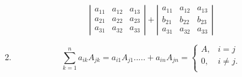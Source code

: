 \documentclass[11pt, a4paper, UTF8]{ctexart}
\begin{document}
\begin{solution}
\begin{enumerate}
\begin{enumerate}
$${        \left|\begin{array}{cccc} 
            a_{11} &    a_{12}    & a_{13} \\ 
            a_{21} &    a_{22}  & a_{23}\\ 
            a_{31} &    a_{32}   & a_{33}
        \end{array}\right| 
        }+{ 
        \left|\begin{array}{cccc} 
            a_{11} &    a_{12}    & a_{13} \\ 
           b_{21} &  b_{22}   & b_{23}\\ 
            a_{31} &    a_{32}   & a_{33}
        \end{array}\right| 
        }$$
        \item $$\sum _{k=1} ^{n}a_{ik}A_{jk}=a_{i1}A_{j1}.....+a_{in}A_{jn}=   {   
             \left\{  
                    \begin{array}{lr}  
                          A, & i=j \\  
                          0, & i\neq j.\\  
                   \end{array}  
         \right.  
              } $$
    \end{enumerate}
  \end{enumerate}
\end{solution}

%
\end{document}
